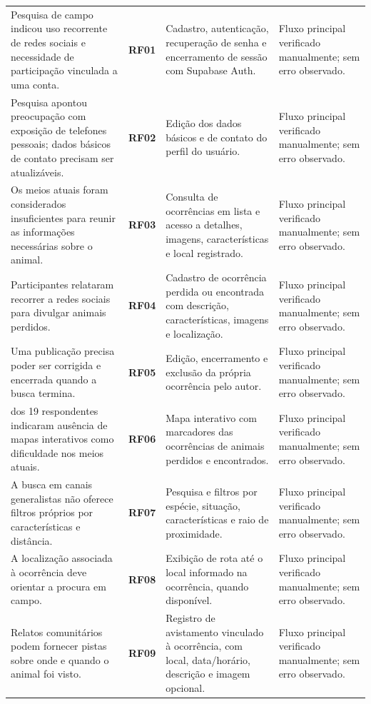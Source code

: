 {\begin{longtable}{|>{\raggedright\arraybackslash}p{4.1cm}|>{\centering\arraybackslash}p{1.4cm}|>{\raggedright\arraybackslash}p{5.8cm}|>{\raggedright\arraybackslash}p{2.7cm}|}
\hline
\multicolumn{4}{|c|}{\textbf{Fonte:} Autoria própria (2026)} \\ \hline
\endlastfoot
Pesquisa de campo indicou uso recorrente de redes sociais e necessidade de participação vinculada a uma conta. & \textbf{RF01} & Cadastro, autenticação, recuperação de senha e encerramento de sessão com Supabase Auth. & Fluxo principal verificado manualmente; sem erro observado. \\ \hline
Pesquisa apontou preocupação com exposição de telefones pessoais; dados básicos de contato precisam ser atualizáveis. & \textbf{RF02} & Edição dos dados básicos e de contato do perfil do usuário. & Fluxo principal verificado manualmente; sem erro observado. \\ \hline
Os meios atuais foram considerados insuficientes para reunir as informações necessárias sobre o animal. & \textbf{RF03} & Consulta de ocorrências em lista e acesso a detalhes, imagens, características e local registrado. & Fluxo principal verificado manualmente; sem erro observado. \\ \hline
Participantes relataram recorrer a redes sociais para divulgar animais perdidos. & \textbf{RF04} & Cadastro de ocorrência perdida ou encontrada com descrição, características, imagens e localização. & Fluxo principal verificado manualmente; sem erro observado. \\ \hline
Uma publicação precisa poder ser corrigida e encerrada quando a busca termina. & \textbf{RF05} & Edição, encerramento e exclusão da própria ocorrência pelo autor. & Fluxo principal verificado manualmente; sem erro observado. \\ \hline
17 dos 19 respondentes indicaram ausência de mapas interativos como dificuldade nos meios atuais. & \textbf{RF06} & Mapa interativo com marcadores das ocorrências de animais perdidos e encontrados. & Fluxo principal verificado manualmente; sem erro observado. \\ \hline
A busca em canais generalistas não oferece filtros próprios por características e distância. & \textbf{RF07} & Pesquisa e filtros por espécie, situação, características e raio de proximidade. & Fluxo principal verificado manualmente; sem erro observado. \\ \hline
A localização associada à ocorrência deve orientar a procura em campo. & \textbf{RF08} & Exibição de rota até o local informado na ocorrência, quando disponível. & Fluxo principal verificado manualmente; sem erro observado. \\ \hline
Relatos comunitários podem fornecer pistas sobre onde e quando o animal foi visto. & \textbf{RF09} & Registro de avistamento vinculado à ocorrência, com local, data/horário, descrição e imagem opcional. & Fluxo principal verificado manualmente; sem erro observado. \\ \hline

\end{longtable}}
